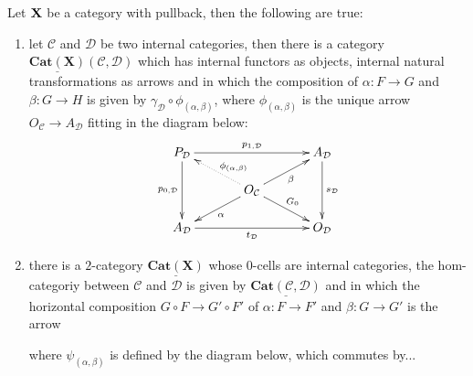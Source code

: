 \documentclass[a4paper,UKenglish,cleveref,pdftex,thm-restate,numberwithinsect]{lipics-v2021}
\newcommand{\cat}[1]{\ensuremath{\mathbf{#1}}}
\newcommand{\dcate}[1]{\underline{\mathbf{Cat}(\cat{#1})}}
\def\X{\textbf {\textup{X}}}
\begin{document}
	
\begin{theorem}
	Let $\X$ be a category with pullback, then the following are true:
	\begin{enumerate}
\item let $\mathcal{C}$ and $\mathcal{D}$ be two internal categories, then there is a category $\dcate{X}(\mathcal{C}, \mathcal{D})$ which has internal functors as objects, internal natural transformations as arrows and in which the composition of $\alpha\colon F\to G$ and $\beta \colon G\to H$ is given by $\gamma_{\mathcal{D}}\circ \phi_{(\alpha, \beta)}$, where $\phi_{(\alpha, \beta)}$  is the unique arrow $O_{\mathcal{C}}\to A_{\mathcal{D}}$ fitting in the diagram below:
\[\xymatrix@C=35pt@R=15pt{ P_{\mathcal{D}} \ar[rr]^{p_{1, \mathcal{D}}} \ar[dd]_{p_{0, \mathcal{D}}} && A_{\mathcal{D}} \ar[dd]^{s_{\mathcal{D}}} \\ & O_{\mathcal{C}} \ar[dr]^{G_0} \ar@{.>}[ul]_(.4){\phi_{(\alpha, \beta)}} \ar[ur]_{\beta} \ar[dl]^{\alpha}\\ A_{\mathcal{D}} \ar[rr]_{t_{\mathcal{D}}}&& O_{\mathcal{D}}   }\]
\item there is a $2$-category $\dcate{X}$ whose $0$-cells are internal categories, the hom-categoriy between $\mathcal{C}$ and $\mathcal{D}$ is given by $\dcate{\mathcal{C}, \mathcal{D}}$ and in which the horizontal composition $G\circ F\to G'\circ F'$ of $\alpha \colon F\to F'$ and $\beta\colon G\to G' $ is the arrow  

where $\psi_{(\alpha, \beta)}$ is defined by the diagram below, which commutes by...  
	\end{enumerate}
\end{theorem}	
	
\end{document}
